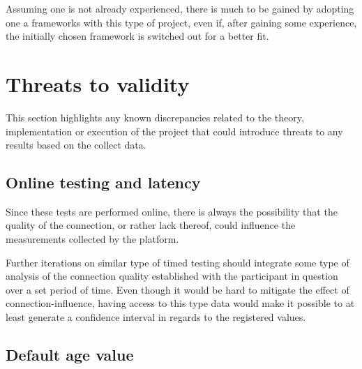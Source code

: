   Assuming one is not already experienced, there is much to be gained by
  adopting one a frameworks with this type of project, even if, after gaining
  some experience, the initially chosen framework is switched out for a better
  fit.


  \section{Threats to validity}

  This section highlights any known discrepancies related to the theory,
  implementation or execution of the project that could introduce threats to
  any results based on the collect data.

  \subsection{Online testing and latency}

  Since these tests are performed online, there is always the possibility that
  the quality of the connection, or rather lack thereof, could influence the
  measurements collected by the platform.

  Further iterations on similar type of timed testing should integrate some
  type of analysis of the connection quality established with the participant
  in question over a set period of time. Even though it would be hard to
  mitigate the effect of connection-influence, having access to this type data
  would make it possible to at least generate a confidence interval in regards
  to the registered values.

%
%
%

  \subsection{Default age value}\label{label_validity_default_age}

